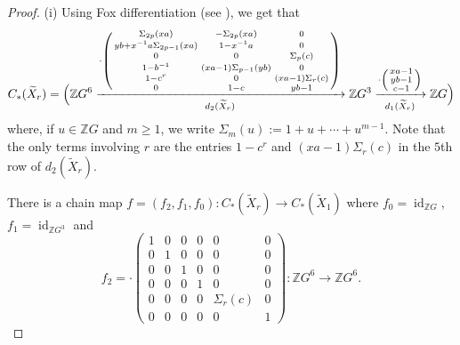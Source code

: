 \documentclass[11pt,a4paper,leqno]{amsart}
\theoremstyle{definition}
\theoremstyle{remark}
\newcommand{\wt}{\widetilde}
\newcommand{\Z}{\mathbb{Z}}
\DeclareMathOperator{\id}{id}
\begin{document}
\begin{proof}
(i) Using Fox differentiation (see \cite[Section 3.2]{Si93}), we get that
\[ C_*(\wt X_r) = \Bigl (\Z G^6 
\xrightarrow[d_2(\wt X_r)]{
\cdot \left(\begin{smallmatrix} 
\Sigma_{2p}(xa) & -\Sigma_{2p}(xa) & 0 \\
yb+x^{-1}a\Sigma_{2p-1}(xa) & 1-x^{-1}a & 0 \\
0 & 0 & \Sigma_p(c) \\
1-b^{-1} & (xa-1)\Sigma_{p-1}(yb) & 0 \\
1-c^r & 0 & (xa-1)\Sigma_r(c) \\
0 & 1-c & yb-1
\end{smallmatrix}\right)
} 
\Z G^3 \xrightarrow[d_1(\wt X_r)]{\cdot \left(\begin{smallmatrix} xa-1 \\ yb-1 \\ c-1 \end{smallmatrix}\right)} \Z G \Bigr ) \]
where, if $u \in \Z G$ and $m \ge 1$, we write $\Sigma_m(u) := 1+u+\cdots+u^{m-1}$.
Note that the only terms involving $r$ are the entries $1-c^r$ and $(xa-1)\Sigma_r(c)$ in the $5$th row of $d_2(\wt X_r)$.

There is a chain map $f=(f_2,f_1,f_0) : C_*(\wt X_r) \to C_*(\wt X_1)$ where $f_0 = \id_{\Z G}$, $f_1 = \id_{\Z G^3}$ and 
\[ f_2 = \cdot \left(\begin{smallmatrix} 
1 & 0 & 0 & 0 & 0 & 0 \\
0 & 1 & 0 & 0 & 0 & 0 \\
0 & 0 & 1 & 0 & 0 & 0 \\
0 & 0 & 0 & 1 & 0 & 0 \\
0 & 0 & 0 & 0 & \Sigma_r(c) & 0 \\
0 & 0 & 0 & 0 & 0 & 1
\end{smallmatrix}\right) : \Z G^6 \to \Z G^6. \]


\end{proof}
\end{document}
